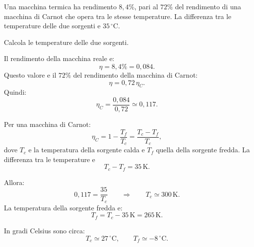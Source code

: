 
\begin{esercizio}
Una macchina termica ha rendimento \(8{,}4\%\), pari al \(72\%\) del rendimento
di una macchina di Carnot che opera tra le stesse temperature. La differenza
tra le temperature delle due sorgenti e \(35\,^\circ\mathrm{C}\).

Calcola le temperature delle due sorgenti.
\end{esercizio}

\begin{soluzione}
Il rendimento della macchina reale e:
\[
\eta=8{,}4\%=0{,}084.
\]
Questo valore e il \(72\%\) del rendimento della macchina di Carnot:
\[
\eta=0{,}72\,\eta_C.
\]
Quindi:
\[
\eta_C=\frac{0{,}084}{0{,}72}\simeq 0{,}117.
\]

Per una macchina di Carnot:
\[
\eta_C=1-\frac{T_f}{T_c}
=\frac{T_c-T_f}{T_c},
\]
dove \(T_c\) e la temperatura della sorgente calda e \(T_f\) quella della
sorgente fredda. La differenza tra le temperature e
\[
T_c-T_f=35\,\mathrm{K}.
\]

Allora:
\[
0{,}117=\frac{35}{T_c}
\qquad\Rightarrow\qquad
T_c\simeq 300\,\mathrm{K}.
\]
La temperatura della sorgente fredda e:
\[
T_f=T_c-35\,\mathrm{K}=265\,\mathrm{K}.
\]

In gradi Celsius sono circa:
\[
T_c\simeq 27\,^\circ\mathrm{C},
\qquad
T_f\simeq -8\,^\circ\mathrm{C}.
\]
\end{soluzione}
